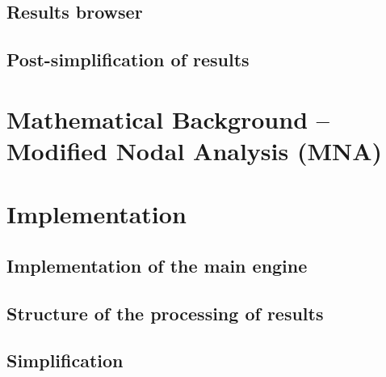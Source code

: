\documentclass[titlepage]{scrartlc}
\begin{document}
        \subsection{Results browser}
        \subsection{Post-simplification of results}
    \section{Mathematical Background -- Modified Nodal Analysis (MNA)}
    \section{Implementation}
        \subsection{Implementation of the main engine}
        \subsection{Structure of the processing of results}
        \subsection{Simplification}
\end{document}
